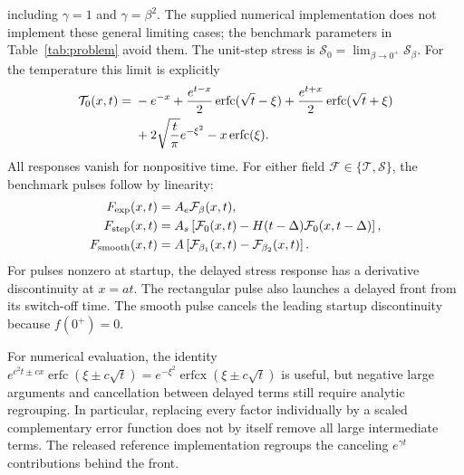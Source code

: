 \documentclass[11pt]{article}
\begin{document}
including $\gamma=1$ and $\gamma=\beta^2$. The supplied numerical
implementation does not implement these general limiting cases; the
benchmark parameters in Table~\ref{tab:problem} avoid them. The unit-step stress is
$\mathcal S_0=\lim_{\beta\to0^+}\mathcal S_\beta$.
For the temperature this limit is explicitly
\begin{align}
 \mathcal T_0(x,t)={}&-e^{-x}
 +\frac{e^{t-x}}2\operatorname{erfc}(\sqrt t-\xi)
 +\frac{e^{t+x}}2\operatorname{erfc}(\sqrt t+\xi)\notag\\
 &+2\sqrt{\frac t\pi}e^{-\xi^2}
 -x\operatorname{erfc}(\xi).
\end{align}
All responses vanish for nonpositive time. For either field
$\mathcal F\in\{\mathcal T,\mathcal S\}$, the benchmark pulses follow by
linearity:
\begin{align}
 F_{\rm exp}(x,t)&=A_e\mathcal F_\beta(x,t),\\
 F_{\rm step}(x,t)&=A_s\left[\mathcal F_0(x,t)
 -H(t-\Delta)\mathcal F_0(x,t-\Delta)\right],\\
 F_{\rm smooth}(x,t)&=A\left[\mathcal F_{\beta_1}(x,t)
 -\mathcal F_{\beta_2}(x,t)\right].
\end{align}
For pulses nonzero at startup, the delayed stress response has a derivative
discontinuity at $x=at$. The rectangular pulse also launches a delayed
front from its switch-off time. The smooth pulse cancels the leading
startup discontinuity because $f(0^+)=0$.

For numerical evaluation, the identity
$e^{c^2t\pm cx}\operatorname{erfc}(\xi\pm c\sqrt t)
=e^{-\xi^2}\operatorname{erfcx}(\xi\pm c\sqrt t)$
is useful, but negative large arguments and cancellation between delayed
terms still require analytic regrouping. In particular, replacing every
factor individually by a scaled complementary error function does not
by itself remove all large intermediate terms. The released reference
implementation regroups the canceling $e^{\gamma t}$
contributions behind the front.

\FloatBarrier


\end{document}
